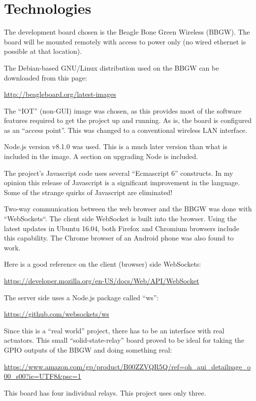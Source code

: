 \section{Technologies}

The development board chosen is the Beagle Bone Green Wireless (BBGW). The 
board will be mounted remotely 
with access to power only (no wired ethernet is possible at that location).

The Debian-based GNU/Linux distribution used on the BBGW can be downloaded from 
this page:

\url{http://beagleboard.org/latest-images}

The ``IOT'' (non-GUI) image was chosen, as this provides most of the software 
features required to get the project up and running.  As is, the board is 
configured as an ``access point''.  This was changed to a conventional wireless 
LAN interface.

Node.js version v8.1.0 was used.  This is a much later version than what is 
included in the image.  A section on upgrading Node is included.

The project's Javascript code uses several ``Ecmascript 6'' constructs.  In my 
opinion this release of Javascript is a significant improvement in the 
language.  Some of the strange quirks of Javascript are eliminated!

Two-way communication between the web browser and the BBGW was done with 
``WebSockets``.  The client side WebSocket is built into the browser.  Using 
the latest updates in Ubuntu 16.04, both Firefox and Chromium browsers include 
this capability.  The Chrome browser of an Android phone was also found to work.

Here is a good reference on the client (browser) side WebSockets:

\url{https://developer.mozilla.org/en-US/docs/Web/API/WebSocket}

The server side uses a Node.js package called ``ws'':

\url{https://github.com/websockets/ws}

Since this is a ``real world'' project, there has to be an interface with real 
actuators.  This small ``solid-state-relay'' board proved to be ideal for 
taking the GPIO outputs of the BBGW and doing something real:

\url{https://www.amazon.com/gp/product/B00ZZVQR5Q/ref=oh_aui_detailpage_o00_s00?ie=UTF8&psc=1}

This board has four individual relays.  This project uses only three.

